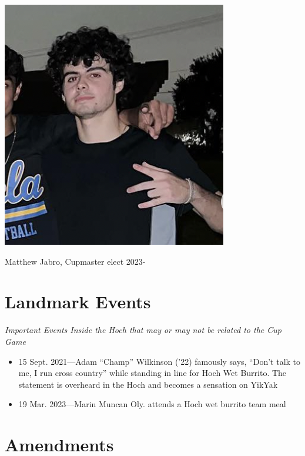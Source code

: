 \documentclass[12pt]{IEEEconf}
\begin{document}
\begin{center}
    \includegraphics*[width=0.7\linewidth]{fig/jabro.png}

    Matthew Jabro, Cupmaster elect 2023-
\end{center}
\section{Landmark Events}
\textit{Important Events Inside the Hoch that may or may not be related to the Cup Game}

\begin{itemize}
    \item 15 Sept. 2021---Adam ``Champ'' Wilkinson ('22) famously says, ``Don't talk to me, I run cross country'' while standing in line for Hoch Wet Burrito. The statement is overheard in the Hoch and becomes a sensation on YikYak
    \item 19 Mar. 2023---Marin Muncan Oly. attends a Hoch wet burrito team meal
\end{itemize}
\section{Amendments}
\end{document}
